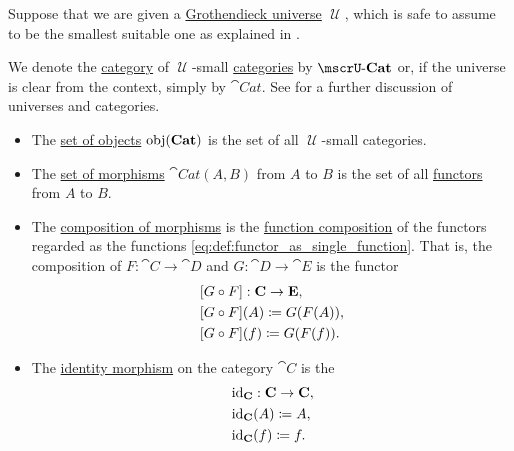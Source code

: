 \begin{definition}\label{def:category_of_small_categories}
  Suppose that we are given a \hyperref[def:grothendieck_universe]{Grothendieck universe} \( \mscrU \), which is safe to assume to be the smallest suitable one as explained in .

  We denote the \hyperref[def:category]{category} of \( \mscrU \)-small \hyperref[def:category]{categories} by \( \ucat{Cat} \) or, if the universe is clear from the context, simply by \( \cat{Cat} \). See  for a further discussion of universes and categories.

  \begin{itemize}
    \item The \hyperref[def:category/objects]{set of objects} \( \operatorname{obj}(\operatorname{\mathbf{Cat}}) \) is the set of all \( \mscrU \)-small categories.

    \item The \hyperref[def:category/morphisms]{set of morphisms} \( \cat{Cat}(A, B) \) from \( A \) to \( B \) is the set of all \hyperref[def:functor]{functors} from \( A \) to \( B \).

    \item The \hyperref[def:category/composition]{composition of morphisms} is the \hyperref[def:multi_valued_function/composition]{function composition} of the functors regarded as the functions \eqref{eq:def:functor_as_single_function}. That is, the composition of \( F: \cat{C} \to \cat{D} \) and \( G: \cat{D} \to \cat{E} \) is the functor
    \begin{equation}\label{eq:def:category_of_small_categories/composition}
      \begin{aligned}
        &[G \bincirc F]: \cat{C} \to \cat{E}, \\
        &[G \bincirc F](A) \coloneqq G(F(A)), \\
        &[G \bincirc F](f) \coloneqq G(F(f)).
      \end{aligned}
    \end{equation}

    \item The \hyperref[def:category/identity]{identity morphism} on the category \( \cat{C} \) is the 
    \begin{equation}\label{eq:def:category_of_small_categories/identity}
      \begin{aligned}
        &\operatorname{id}_{\operatorname{\mathbf{C}}}: \operatorname{\mathbf{C}} \to \operatorname{\mathbf{C}}, \\
        &\operatorname{id}_{\operatorname{\mathbf{C}}}(A) \coloneqq A, \\
        &\operatorname{id}_{\operatorname{\mathbf{C}}}(f) \coloneqq f.
      \end{aligned}
    \end{equation}
  \end{itemize}
\end{definition}
